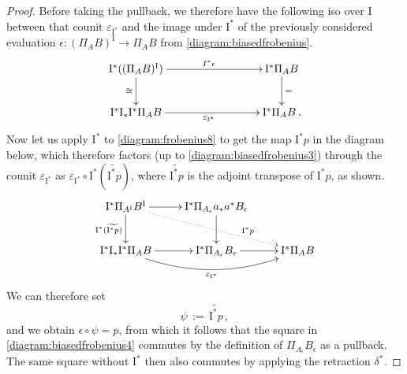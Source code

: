 \documentclass[12pt]{article}
\renewcommand{\to}{\ensuremath{\rightarrow}}
\newcommand{\I}{\ensuremath{\mathrm{I}}}
\renewcommand{\i}{\mathsf{i}}
\theoremstyle{remark}
\theoremstyle{definition}
\begin{document}
\begin{proof}
Before taking the pullback, we therefore have the following iso over $\I$ between that counit $\varepsilon_{\I^*}$ and the image under $\I^*$ of the previously considered evaluation $\epsilon : (\Pi_AB)^\I \to \Pi_AB$ from \eqref{diagram:biasedfrobenius}.
\begin{equation}\label{diagram:biasedfrobenius3}
\xymatrix{
\I^*((\Pi_AB)^\I) \ar[d]_{\cong}  \ar[rrr]^{\\I^*\epsilon} &&& \I^*\Pi_AB  \ar[d]^{=} \\
\I^*\I_*\I^*\Pi_AB   \ar[rrr]_{\varepsilon_{\I^*}}  &&&  \I^*\Pi_AB\,.
}
\end{equation}
%
Now let us apply $\I^*$ to  \eqref{diagram:frobenius8} to get the map $\I^*p$ in the diagram below, which therefore factors (up to \eqref{diagram:biasedfrobenius3}) through the counit $\varepsilon_{\I^*}$ as $\varepsilon_{\I^*}\circ\I^*(\widetilde{\I^*p})$, where $\widetilde{\I^*p}$ is the adjoint transpose of $\I^*p$, as shown.
%
\begin{equation}\label{diagram:biasedfrobenius4}
\xymatrix{
\I^*\Pi_{A^\I}B^\I \ar[d]_{\I^*(\widetilde{\I^*p})} \ar[r] \ar@{..>}[rrd]^>>>>>>>>>>>{\I^*p} & \I^*\Pi_{A_\epsilon} a_*a^* B_\epsilon \ar[d] & \\
  \I^*\I_*\I^*\Pi_AB  \ar[r] \ar@/_4ex/ [rr]_{\varepsilon_{\I^*}} & \I^*\Pi_{A_\epsilon}B_\epsilon \ar[r] & \I^*\Pi_{A}B 
}
\end{equation}
%
We can therefore set $$\psi\, := \, \widetilde{\I^*p}\,,$$
and we obtain $\epsilon\circ \psi = p$, from which it follows that the square in \eqref{diagram:biasedfrobenius4} commutes by the definition of $\Pi_{A_\epsilon}B_\epsilon$ as a pullback. The same square without $\I^*$ then also commutes by applying the retraction $\delta^*$.  


\end{proof}
\end{document}
